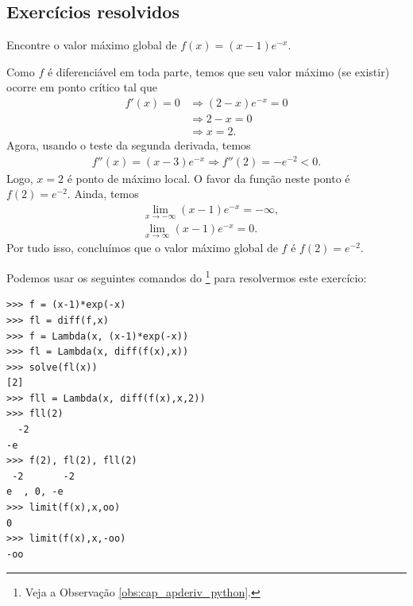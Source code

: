 \subsection*{Exercícios resolvidos}

\begin{exeresol}
  Encontre o valor máximo global de $f(x) = (x-1)e^{-x}$.
\end{exeresol}
\begin{resol}
  Como $f$ é diferenciável em toda parte, temos que seu valor máximo (se existir) ocorre em ponto crítico tal que
  \begin{align}
    f'(x) = 0 &\Rightarrow (2-x)e^{-x} = 0 \\
              &\Rightarrow 2-x = 0 \\
              &\Rightarrow x = 2.
  \end{align}
  Agora, usando o teste da segunda derivada, temos
  \begin{align}
    f''(x) = (x-3)e^{-x} \Rightarrow f''(2) = -e^{-2} < 0.
  \end{align}
  Logo, $x=2$ é ponto de máximo local. O favor da função neste ponto é $f(2) = e^{-2}$. Ainda, temos
  \begin{align}
    &\lim_{x\to -\infty} (x-1)e^{-x} = -\infty, \\
    &\lim_{x\to \infty} (x-1)e^{-x} = 0.
  \end{align}
  Por tudo isso, concluímos que o valor máximo global de $f$ é $f(2) = e^{-2}$.

  \ifispython
  Podemos usar os seguintes comandos do \sympy\footnote{Veja a Observação \ref{obs:cap_apderiv_python}.} para resolvermos este exercício:
\begin{verbatim}
>>> f = (x-1)*exp(-x)
>>> fl = diff(f,x)
>>> f = Lambda(x, (x-1)*exp(-x))
>>> fl = Lambda(x, diff(f(x),x))
>>> solve(fl(x))
[2]
>>> fll = Lambda(x, diff(f(x),x,2))
>>> fll(2)
  -2
-e  
>>> f(2), fl(2), fll(2)
 -2       -2
e  , 0, -e  
>>> limit(f(x),x,oo)
0
>>> limit(f(x),x,-oo)
-oo
\end{verbatim}
  \fi
\end{resol}


